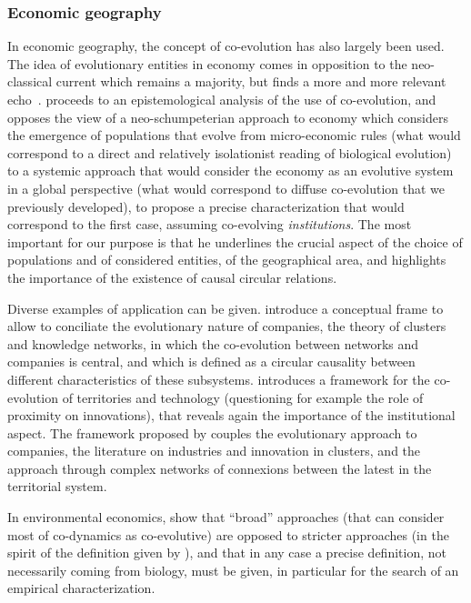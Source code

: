\documentclass[letterpaper]{article}
\begin{document}
\subsubsection{Economic geography}

In economic geography, the concept of co-evolution has also largely been used. The idea of evolutionary entities in economy comes in opposition to the neo-classical current which remains a majority, but finds a more and more relevant echo~\cite{nelson2009evolutionary}. \cite{schamp201020} proceeds to an epistemological analysis of the use of co-evolution, and opposes the view of a neo-schumpeterian approach to economy which considers the emergence of populations that evolve from micro-economic rules (what would correspond to a direct and relatively isolationist reading of biological evolution) to a systemic approach that would consider the economy as an evolutive system in a global perspective (what would correspond to diffuse co-evolution that we previously developed), to propose a precise characterization that would correspond to the first case, assuming co-evolving \emph{institutions}. The most important for our purpose is that he underlines the crucial aspect of the choice of populations and of considered entities, of the geographical area, and highlights the importance of the existence of causal circular relations.


Diverse examples of application can be given. \cite{doi:10.1080/00343400802662658} introduce a conceptual frame to allow to conciliate the evolutionary nature of companies, the theory of clusters and knowledge networks, in which the co-evolution between networks and companies  is central, and which is defined as a circular causality between different characteristics of these subsystems. \cite{colletis2010co} introduces a framework for the co-evolution of territories and technology (questioning for example the role of proximity on innovations), that reveals again the importance of the institutional aspect. The framework proposed by \cite{ter2011co} couples the evolutionary approach to companies, the literature on industries and innovation in clusters, and the approach through complex networks of connexions between the latest in the territorial system.

In environmental economics, \cite{kallis2007coevolution} show that ``broad'' approaches (that can consider most of co-dynamics as co-evolutive) are opposed to stricter approaches (in the spirit of the definition given by \cite{schamp201020}), and that in any case a precise definition, not necessarily coming from biology, must be given, in particular for the search of an empirical characterization.
\end{document}
